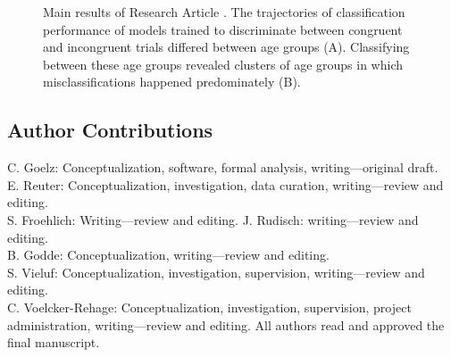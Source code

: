 \begin{figure}[h]
\begin{center}

\caption[Main results of Research Article .]{Main results of Research Article . The trajectories of classification performance of models trained to discriminate between congruent and incongruent trials differed between age groups (A). Classifying between these age groups revealed clusters of age groups in which misclassifications happened predominately (B).}
\label{fig:results2}
\end{center}
\end{figure}

\subsection*{Author Contributions}
C. Goelz: Conceptualization, software, formal analysis, writing—original draft.\\
E. Reuter: Conceptualization, investigation, data curation, writing—review and editing.\\
S. Froehlich: Writing—review and editing. 
J. Rudisch: writing—review and editing.\\ 
B. Godde: Conceptualization, writing—review and editing.\\ 
S. Vieluf: Conceptualization, investigation, supervision, writing—review and editing.\\ 
C. Voelcker-Rehage: Conceptualization, investigation, supervision, project administration, writing—review and editing. All authors read and approved the final manuscript.\\

